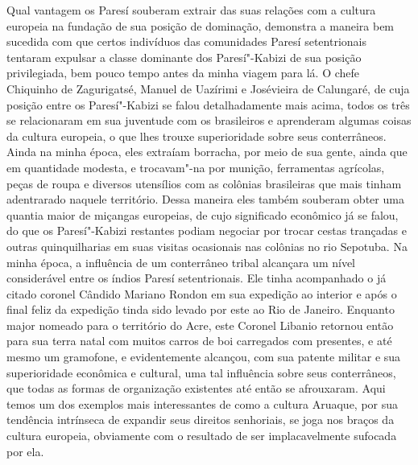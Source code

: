 Qual vantagem os Paresí souberam extrair das suas relações com a
cultura europeia na fundação de sua posição de dominação, demonstra a
maneira bem sucedida com que certos indivíduos das comunidades Paresí
setentrionais tentaram expulsar a classe dominante dos Paresí"-Kabizi de
sua posição privilegiada, bem pouco tempo antes da minha viagem para
lá. O chefe Chiquinho de Zagurigatsé, Manuel de Uazírimi e Josévieira
de Calungaré, de cuja posição entre os Paresí"-Kabizi se falou
detalhadamente mais acima, todos os três se relacionaram em sua
juventude com os brasileiros e aprenderam algumas coisas da cultura
europeia, o que lhes trouxe superioridade sobre seus conterrâneos. Ainda
na minha época, eles extraíam borracha, por meio de sua gente, ainda
que em quantidade modesta, e trocavam"-na por munição, ferramentas
agrícolas, peças de roupa e diversos utensílios com as colônias
brasileiras que mais tinham adentrarado naquele território. Dessa
maneira eles também souberam obter uma quantia maior de miçangas
europeias, de cujo significado econômico já se falou, do que os
Paresí"-Kabizi restantes podiam negociar por trocar cestas trançadas e
outras quinquilharias em suas visitas ocasionais nas colônias no rio
Sepotuba. Na minha época, a influência de um conterrâneo tribal
alcançara um nível considerável entre os índios Paresí setentrionais.
Ele tinha acompanhado o já citado coronel Cândido Mariano Rondon em sua
expedição ao interior e após o final feliz da expedição tinda sido
levado por este ao Rio de Janeiro. Enquanto major nomeado para o
território do Acre, este Coronel Libanio retornou então para sua terra
natal com muitos carros de boi carregados com presentes, e até mesmo um
gramofone, e evidentemente alcançou, com sua patente militar e sua
superioridade econômica e cultural, uma tal influência sobre seus
conterrâneos, que todas as formas de organização existentes até então
se afrouxaram. Aqui temos um dos exemplos mais interessantes de como a
cultura Aruaque, por sua tendência intrínseca de expandir seus direitos
senhoriais, se joga nos braços da cultura europeia, obviamente com o
resultado de ser implacavelmente sufocada por ela.

